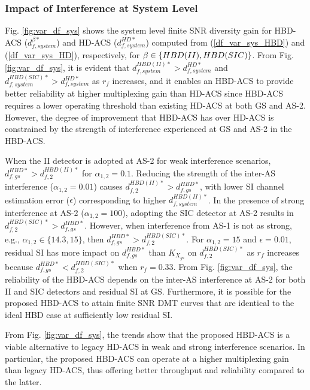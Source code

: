 \subsubsection{Impact of Interference at System Level}

Fig. \ref{fig:var_df_sys} shows the system level finite SNR diversity gain for HBD-ACS ($d_{f,system}^{\beta*}$) and HD-ACS ($d_{f,system}^{HD*}$) computed from (\ref{df_var_sys_HBD}) and (\ref{df_var_sys_HD}), respectively, for $\beta \in \{HBD(II),\\ HBD(SIC)\}$. From Fig. \ref{fig:var_df_sys}, it is evident that $d_{f,system}^{HBD(II)*} > d_{f,system}^{HD*}$ and $d_{f,system}^{HBD(SIC)*} > d_{f,system}^{HD*}$ as $r_f$ increases, and it enables an HBD-ACS to provide better reliability at higher multiplexing gain than HD-ACS since HBD-ACS requires a lower operating threshold than existing HD-ACS at both GS and AS-2. However, the degree of improvement that HBD-ACS has over HD-ACS is constrained by the strength of interference experienced at GS and AS-2 in the HBD-ACS.

When the II detector is adopted at AS-2 for weak interference scenarios, $d_{f,gs}^{HBD*} > d_{f,2}^{HBD(II)*}$ for $\alpha_{1,2}=0.1$. Reducing the strength of the inter-AS interference ($\alpha_{1,2}=0.01$) causes $d_{f,2}^{HBD(II)*} > d_{f,gs}^{HBD*}$, with lower SI channel estimation error ($\epsilon $) corresponding to higher $d_{f,system}^{HBD(II)*}$. In the presence of strong interference at AS-2 ($\alpha_{1,2}=100$), adopting the SIC detector at AS-2 results in $d_{f,2}^{HBD(SIC)*} > d_{f,gs}^{HBD*}$. However, when interference from AS-1 is not as strong, e.g., $\alpha_{1,2} \in \{14.3, 15\}$, then $d_{f,gs}^{HBD*} > d_{f,2}^{HBD(SIC)*}$. For $\alpha_{1,2}=15$ and $\epsilon = 0.01$, residual SI has more impact on $d_{f,gs}^{HBD*}$ than $K_{X_{gs}}$ on $d_{f,2}^{HBD(SIC)*}$ as $r_f$ increases because $d_{f,gs}^{HBD*} < d_{f,2}^{HBD(SIC)*}$ when $r_f = 0.33$. From Fig. \ref{fig:var_df_sys}, the reliability of the HBD-ACS depends on the inter-AS interference at AS-2 for both II and SIC detectors and residual SI at GS. Furthermore, it is possible for the proposed HBD-ACS to attain finite SNR DMT curves that are identical to the ideal HBD case at sufficiently low residual SI.

From Fig. \ref{fig:var_df_sys}, the trends show that the proposed HBD-ACS is a viable alternative to legacy HD-ACS in weak and strong interference scenarios. In particular, the proposed HBD-ACS can operate at a higher multiplexing gain than legacy HD-ACS, thus offering better throughput and reliability compared to the latter.

